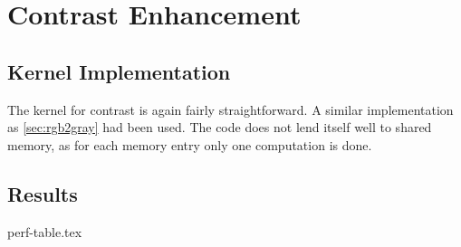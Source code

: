 \documentclass[final]{report}
\begin{document}
\chapter{Contrast Enhancement}

\section{Kernel Implementation}
The kernel for contrast is again fairly straightforward.
A similar implementation as \cref{sec:rgb2gray} had been used.
The code does not lend itself well to shared memory, as for each memory entry only one computation is done.

\section{Results}
{perf-table.tex}
\end{document}
